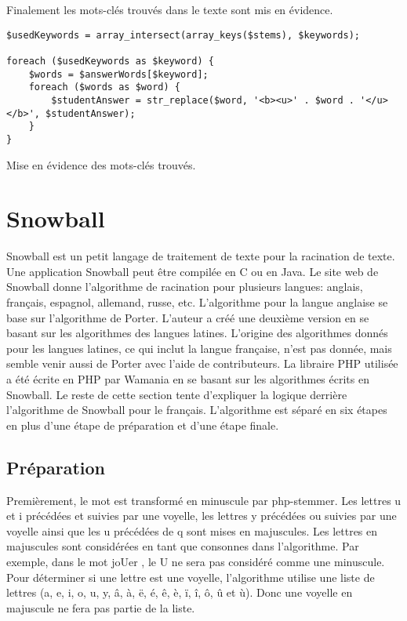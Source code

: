 Finalement les mots-clés trouvés dans le texte sont mis en évidence.

\begin{lstfloat}
\begin{lstlisting}[frame=l]
$usedKeywords = array_intersect(array_keys($stems), $keywords);

foreach ($usedKeywords as $keyword) {
	$words = $answerWords[$keyword];
	foreach ($words as $word) {
		$studentAnswer = str_replace($word, '<b><u>' . $word . '</u></b>', $studentAnswer);
	}
}
\end{lstlisting}
\caption{Mise en évidence des mots-clés trouvés.}
\label{code:commentaire}
\end{lstfloat}

\section{Snowball}

Snowball est un petit langage de traitement de texte pour la racination de texte.
Une application Snowball peut être compilée en C ou en Java.
Le site web de Snowball donne l'algorithme de racination pour plusieurs langues: anglais, français, espagnol, allemand, russe, etc.
L'algorithme pour la langue anglaise se base sur l'algorithme de Porter.
L'auteur a créé une deuxième version en se basant sur les algorithmes des langues latines.
L'origine des algorithmes donnés pour les langues latines, ce qui inclut la langue française, n'est pas donnée, mais semble venir aussi de Porter avec l'aide de contributeurs.
La libraire PHP utilisée a été écrite en PHP par Wamania en se basant sur les algorithmes écrits en Snowball.
Le reste de cette section tente d'expliquer la logique derrière l'algorithme de Snowball pour le français.
L'algorithme est séparé en six étapes en plus d'une étape de préparation et d'une étape finale.

\subsection*{Préparation}

Premièrement, le mot est transformé en minuscule par php-stemmer.
Les lettres u et i précédées et suivies par une voyelle, les lettres y précédées ou suivies par une voyelle ainsi que les u précédées de q sont mises en majuscules.
Les lettres en majuscules sont considérées en tant que consonnes dans l'algorithme.
Par exemple, dans le mot \og joUer \fg{}, le U ne sera pas considéré comme une minuscule.
Pour déterminer si une lettre est une voyelle, l'algorithme utilise une liste de lettres (a, e, i, o, u, y, â, à, ë, é, ê, è, ï, î, ô, û et ù).
Donc une voyelle en majuscule ne fera pas partie de la liste.

